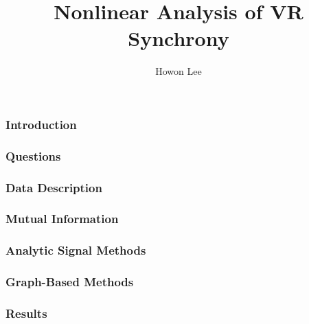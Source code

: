 \documentclass{beamer}
\begin{document}
\title{Nonlinear Analysis of VR Synchrony}
\author{Howon Lee}
\maketitle

\begin{frame}
  \frametitle{Introduction}
\end{frame}
\begin{frame}
  \frametitle{Questions}
\end{frame}
\begin{frame}
  \frametitle{Data Description}
\end{frame}
\begin{frame}
  \frametitle{Mutual Information}
\end{frame}
\begin{frame}
  \frametitle{Analytic Signal Methods}
\end{frame}
\begin{frame}
  \frametitle{Graph-Based Methods}
\end{frame}
\begin{frame}
  \frametitle{Results}
\end{frame}
\end{document}
